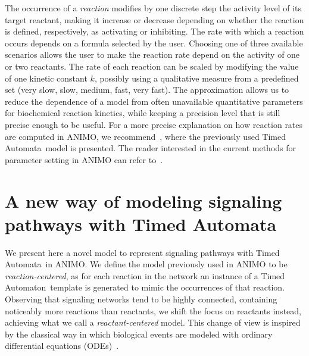 \documentclass{llncs}
\newcommand{\ta}{Timed Automaton}
\newcommand{\tas}{Timed Automata}
\begin{document}
The occurrence of a \emph{reaction} modifies by one discrete step the activity level of its target reactant, making it increase or decrease 
depending on whether the reaction is defined, respectively, as activating or inhibiting.
The rate with which a reaction occurs depends on a formula selected by the user. 
Choosing one of three available scenarios allows the user to make the reaction rate depend on
the activity of one or two reactants.
The rate of each reaction can be scaled by modifying the value of one kinetic constant $k$,
possibly using a qualitative measure from a predefined set ({\sf very slow}, {\sf slow},
{\sf medium}, {\sf fast}, {\sf very fast}).
The approximation allows us to reduce the dependence of a model from often unavailable quantitative
parameters for biochemical reaction kinetics, while keeping a precision level that is still precise enough to be useful.
For a more precise explanation on how reaction rates are computed in ANIMO, we recommend~\cite{animo-ieee},
where the previously used \tas\ model is presented. The reader interested in the current
methods for parameter setting in ANIMO can refer to~\cite{animo-syncop}.




\section{A new way of modeling signaling pathways with \tas}\label{sec:animo-new}
We present here a novel model to represent signaling pathways with \tas\ in ANIMO.
We define the model previously used in ANIMO to be \emph{reaction-centered}, as for each reaction
in the network an instance of a \ta\ template is generated to mimic
the occurrences of that reaction. Observing that signaling
networks tend to be highly connected, containing noticeably more reactions than reactants,
we shift the focus on reactants instead, achieving what we call a \emph{reactant-centered} model.
This change of view is inspired by the classical way in which biological events are modeled
with ordinary differential equations (ODEs)~\cite{ode-ma-anche-altro}.

\end{document}
